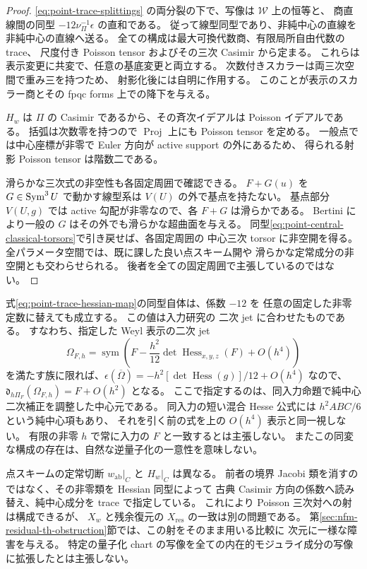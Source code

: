 \begin{proof}
\eqref{eq:point-trace-splittings} の両分裂の下で、写像は $\mathcal W$ 上の恒等と、
商直線間の同型 $-12\nu_\Pi^{-1}\epsilon$ の直和である。
従って線型同型であり、非純中心の直線を非純中心の直線へ送る。
全ての構成は最大可換代数商、有限局所自由代数の trace、
尺度付き Poisson tensor およびその三次 Casimir から定まる。
これらは表示変更に共変で、任意の基底変更と両立する。
次数付きスカラーは両三次空間で重み三を持つため、
射影化後には自明に作用する。
このことが表示のスカラー商とその fpqc forms 上での降下を与える。

$H_w$ は $\Pi$ の Casimir であるから、その斉次イデアルは Poisson イデアルである。
括弧は次数零を持つので $\operatorname{Proj}$ 上にも Poisson tensor を定める。
一般点では中心座標が非零で Euler 方向が active support の外にあるため、
得られる射影 Poisson tensor は階数二である。

滑らかな三次式の非空性も各固定周囲で確認できる。
$F+G(u)$ を $G\in\operatorname{Sym}^3U$ で動かす線型系は $V(U)$ の外で基点を持たない。
基点部分 $V(U,g)$ では active 勾配が非零なので、各 $F+G$ は滑らかである。
Bertini により一般の $G$ はその外でも滑らかな超曲面を与える。
同型\eqref{eq:point-central-classical-torsors}で引き戻せば、各固定周囲の
中心三次 torsor に非空開を得る。
全パラメータ空間では、既に課した良い点スキーム開や
滑らかな定常成分の非空開とも交わらせられる。
後者を全ての固定周囲で主張しているのではない。
\end{proof}

\begin{remark}
式\eqref{eq:point-trace-hessian-map}の同型自体は、係数 $-12$ を
任意の固定した非零定数に替えても成立する。
この値は入力研究\cite[Proposition \texttt{prop:pg-ad-intrinsic-hessian}]{CubicQuantization}の
二次 jet に合わせたものである。
すなわち、指定した Weyl 表示の二次 jet
\[
 \Omega_{F,h}=\operatorname{sym}
 \left(F-\frac{h^2}{12}\det\operatorname{Hess}_{x,y,z}(F)+O(h^4)\right)
\]
を満たす族に限れば、$\epsilon(\overline\Omega)
=-h^2[\det\operatorname{Hess}(g)]/12+O(h^4)$ なので、
$\mathfrak d_{h\Pi_F}(\Omega_{F,h})=F+O(h^2)$ となる。
ここで指定するのは、同入力命題で純中心二次補正を調整した中心元である。
同入力の短い混合 Hesse 公式には $h^2ABC/6$ という純中心項もあり、
それを引く前の式を上の $O(h^4)$ 表示と同一視しない。
有限の非零 $h$ で常に入力の $F$ と一致するとは主張しない。
またこの同変な構成の存在は、自然な逆量子化の一意性を意味しない。

点スキームの定常切断 $w_{\mathrm{ab}}|_C$ と $H_w|_C$ は異なる。
前者の境界 Jacobi 類を消すのではなく、その非零類を Hessian 同型によって
古典 Casimir 方向の係数へ読み替え、純中心成分を trace で指定している。
これにより Poisson 三次対への射は構成できるが、
$X_w$ と残余復元の $X_{\mathrm{res}}$ の一致は別の問題である。
第\ref{sec:nfm-residual-th-obstruction}節では、この射をそのまま用いる比較に
次元に一様な障害を与える。
特定の量子化 chart の写像を全ての内在的モジュライ成分の写像に拡張したとは主張しない。
\end{remark}

